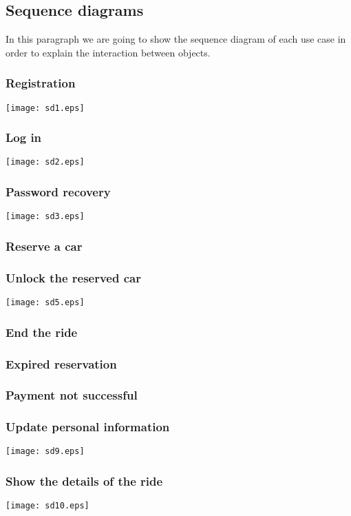 \pagebreak
\subsection{Sequence diagrams}
In this paragraph we are going to show the sequence diagram of each use case in order to explain the interaction between objects.

\subsubsection{Registration}
	\centerline{
		\texttt{[image: sd1.eps]}}
	\pagebreak

\subsubsection{Log in}
	\centerline{
		\texttt{[image: sd2.eps]}}
	\pagebreak

\subsubsection{Password recovery}
	\centerline{
		\texttt{[image: sd3.eps]}}
	\pagebreak
	
\subsubsection{Reserve a car}
	
\subsubsection{Unlock the reserved car}
	\centerline{
		\texttt{[image: sd5.eps]}}
		\pagebreak

\subsubsection{End the ride}

\subsubsection{Expired reservation}
	
\subsubsection{Payment not successful}
	\pagebreak
	
\subsubsection{Update personal information}
	\centerline{
		\texttt{[image: sd9.eps]}}
	\pagebreak
	
\subsubsection{Show the details of the ride}
	\centerline{
		\texttt{[image: sd10.eps]}}